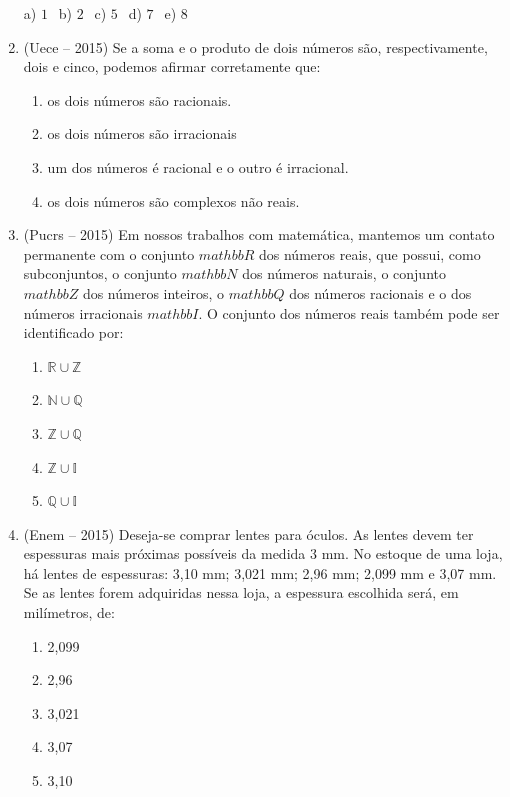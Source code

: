 \begin{multicols*}{2}
\begin{enumerate}
		a) $ 1 \ \ $ b) $ 2 \ \ $ c) $ 5 \ \ $ d) $ 7 \ \ $ e) $ 8 \ \ $

	\item (Uece – 2015) Se a soma e o produto de dois números são, respectivamente, dois e cinco, podemos afirmar corretamente que: 
		
		\begin{enumerate}
				
		\item  os dois números são racionais. 
		\item  os dois números são irracionais 
		\item  um dos números é racional e o outro é irracional. 
		\item  os dois números são complexos não reais. 

		\end{enumerate}

	\item (Pucrs – 2015) Em nossos trabalhos com matemática, mantemos um contato permanente com o conjunto $ mathbb{R} $ dos números reais, que possui, como subconjuntos, o conjunto $ mathbb{N} $ dos números naturais, o conjunto $ mathbb{Z} $ dos números inteiros, o $ mathbb{Q} $ dos números racionais e o dos números irracionais $ mathbb{I} $. O conjunto dos números reais também pode ser identificado por: 
		
		\begin{enumerate}		
		
		\item $ \mathbb{R} \cup \mathbb{Z} $
		\item $ \mathbb{N} \cup \mathbb{Q} $
		\item $ \mathbb{Z} \cup \mathbb{Q} $
		\item $ \mathbb{Z} \cup \mathbb{I} $
		\item $ \mathbb{Q} \cup \mathbb{I} $

		\end{enumerate}

	\item (Enem – 2015) Deseja-se comprar lentes para óculos. As lentes devem ter espessuras mais próximas possíveis da medida 3 mm. No estoque de uma loja, há lentes de espessuras: 3,10 mm; 3,021 mm; 2,96 mm; 2,099 mm e 3,07 mm. 
Se as lentes forem adquiridas nessa loja, a espessura escolhida será, em milímetros, de: 

		\begin{enumerate}		

		\item 2,099 
		\item 2,96 
		\item 3,021 
		\item 3,07 
		\item 3,10


\end{enumerate}
\end{enumerate}
\end{multicols*}
